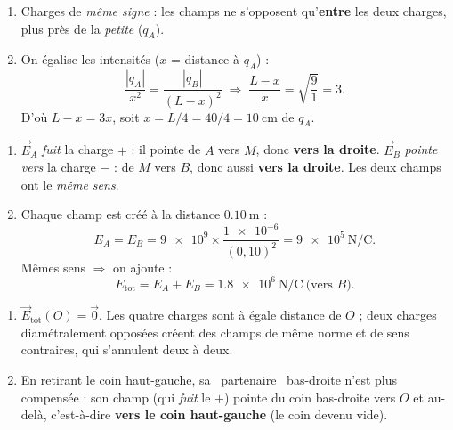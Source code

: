 \documentclass[11pt,a4paper]{article}
\newcommand{\vv}[1]{\vec{#1}}\newcommand{\ds}{\displaystyle}
\begin{document}

\begin{corrige}
\begin{enumerate}[label=\alph*)]
  \item Charges de \emph{même signe} : les champs ne s'opposent qu'\textbf{entre} les deux charges,
        plus près de la \emph{petite} ($q_A$).
  \item On égalise les intensités ($x$ = distance à $q_A$) :
        \[ \frac{|q_A|}{x^2} = \frac{|q_B|}{(L-x)^2}
           \;\Longrightarrow\; \frac{L-x}{x} = \sqrt{\frac{9}{1}} = 3. \]
        D'où $L-x = 3x$, soit $x = L/4 = 40/4 = \SI{10}{\centi\metre}$ de $q_A$.
\end{enumerate}
\end{corrige}

\begin{corrige}
\begin{enumerate}[label=\alph*)]
  \item $\vv{E}_A$ \emph{fuit} la charge $+$ : il pointe de $A$ vers $M$, donc \textbf{vers la
        droite}. $\vv{E}_B$ \emph{pointe vers} la charge $-$ : de $M$ vers $B$, donc aussi
        \textbf{vers la droite}. Les deux champs ont le \emph{même sens}.
  \item Chaque champ est créé à la distance $\SI{0.10}{\metre}$ :
        \[ E_A = E_B = \num{9e9}\times\frac{\num{1e-6}}{(0{,}10)^2} = \SI{9e5}{\newton\per\coulomb}. \]
        Mêmes sens $\Rightarrow$ on ajoute :
        \[ E_{\text{tot}} = E_A + E_B = \SI{1.8e6}{\newton\per\coulomb}\ \text{(vers } B). \]
\end{enumerate}
\end{corrige}

\begin{corrige}
\begin{enumerate}[label=\alph*)]
  \item $\vv{E}_{\text{tot}}(O) = \vv{0}$. Les quatre charges sont à égale distance de $O$ ; deux
        charges diamétralement opposées créent des champs de même norme et de sens contraires, qui
        s'annulent deux à deux.
  \item En retirant le coin haut-gauche, sa \guillemotleft~partenaire~\guillemotright{} bas-droite
        n'est plus compensée : son champ (qui \emph{fuit} le $+$) pointe du coin bas-droite vers
        $O$ et au-delà, c'est-à-dire \textbf{vers le coin haut-gauche} (le coin devenu vide).
\end{enumerate}
\end{corrige}
\end{document}
